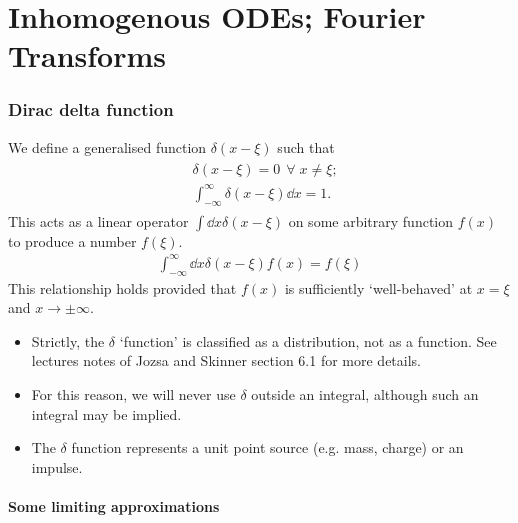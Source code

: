 \part{Inhomogenous ODEs; Fourier Transforms}
\section{Dirac delta function}

\begin{definition}
	We define a generalised function $\delta(x - \xi)$ such that
	\begin{align}
		\begin{aligned} \label{eq:6.1}
			&\delta(x-\xi) = 0 \ \ \forall \; x \neq \xi; \\
			&\int_{-\infty}^\infty \delta(x-\xi) \dd{x} = 1.
		\end{aligned} 	
	\end{align} 
	This acts as a linear operator $\int \dd{x} \delta(x - \xi)$ on some arbitrary function $f(x)$ to produce a number $f(\xi)$.
	\begin{align} \label{eq:6.2}
		\int_{-\infty}^\infty \dd{x} \delta(x-\xi) f(x) = f(\xi)
	\end{align}
	This relationship holds provided that $f(x)$ is sufficiently `well-behaved' at $x=\xi$ and $x\to\pm \infty$.
\end{definition}

\begin{note}
	\begin{itemize}
		\item Strictly, the $\delta$ `function' is classified as a distribution, not as a function.
		See lectures notes of Jozsa and Skinner section 6.1 for more details.
		\item For this reason, we will never use $\delta$ outside an integral, although such an integral may be implied.
		\item The $\delta$ function represents a unit point source (e.g. mass, charge) or an impulse.
	\end{itemize} 
\end{note}

\subsection{Some limiting approximations}


